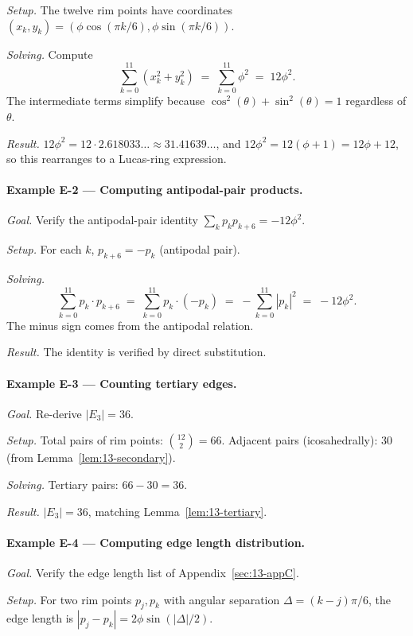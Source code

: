 \emph{Setup.} The twelve rim points have coordinates
$(x_{k}, y_{k}) = (\phi \cos(\pi k/6), \phi \sin(\pi k/6))$.

\emph{Solving.} Compute
\[
  \sum_{k=0}^{11} (x_{k}^{2} + y_{k}^{2})
  \;=\; \sum_{k=0}^{11} \phi^{2}
  \;=\; 12 \phi^{2}.
\]
The intermediate terms simplify because
$\cos^{2}(\theta) + \sin^{2}(\theta) = 1$ regardless of $\theta$.

\emph{Result.} $12 \phi^{2} = 12 \cdot 2.618033\ldots \approx
31.41639\ldots$, and $12 \phi^{2} = 12(\phi + 1) = 12\phi + 12$,
so this rearranges to a Lucas-ring expression.

\paragraph{Example E-2 --- Computing antipodal-pair products.}
\emph{Goal.} Verify the antipodal-pair identity
$\sum_{k} p_{k} p_{k+6} = -12 \phi^{2}$.

\emph{Setup.} For each $k$, $p_{k+6} = -p_{k}$ (antipodal pair).

\emph{Solving.}
\[
  \sum_{k=0}^{11} p_{k} \cdot p_{k+6}
  \;=\; \sum_{k=0}^{11} p_{k} \cdot (-p_{k})
  \;=\; -\sum_{k=0}^{11} |p_{k}|^{2}
  \;=\; -12 \phi^{2}.
\]
The minus sign comes from the antipodal relation.

\emph{Result.} The identity is verified by direct substitution.

\paragraph{Example E-3 --- Counting tertiary edges.}
\emph{Goal.} Re-derive $|E_{3}| = 36$.

\emph{Setup.} Total pairs of rim points: $\binom{12}{2} = 66$.
Adjacent pairs (icosahedrally): $30$ (from
Lemma~\ref{lem:13-secondary}).

\emph{Solving.} Tertiary pairs: $66 - 30 = 36$.

\emph{Result.} $|E_{3}| = 36$, matching Lemma~\ref{lem:13-tertiary}.

\paragraph{Example E-4 --- Computing edge length distribution.}
\emph{Goal.} Verify the edge length list of
Appendix~\ref{sec:13-appC}.

\emph{Setup.} For two rim points $p_{j}, p_{k}$ with angular
separation $\Delta = (k - j) \pi/6$, the edge length is
$|p_{j} - p_{k}| = 2 \phi \sin(|\Delta|/2)$.

